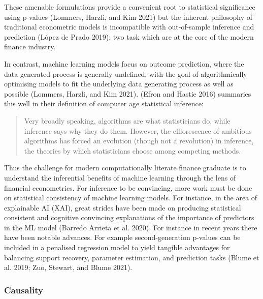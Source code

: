\documentclass{article}
\begin{document}
These amenable formulations provide a convenient root to statistical
significance using p-values (Lommers, Harzli, and Kim 2021) but the
inherent philosophy of traditional econometric models is incompatible
with out-of-sample inference and prediction (López de Prado 2019); two
task which are at the core of the modern finance industry.

In contrast, machine learning models focus on outcome prediction, where
the data generated process is generally undefined, with the goal of
algorithmically optimising models to fit the underlying data generating
process as well as possible (Lommers, Harzli, and Kim 2021). (Efron and
Hastie 2016) summaries this well in their definition of computer age
statistical inference:

\begin{quote}
Very broadly speaking, algorithms are what statisticians do, while
inference says why they do them. However, the efflorescence of ambitious
algorithms has forced an evolution (though not a revolution) in
inference, the theories by which statisticians choose among competing
methods.
\end{quote}

Thus the challenge for modern computationally literate finance graduate
is to understand the inferential benefits of machine learning through
the lens of financial econometrics. For inference to be convincing, more
work must be done on statistical consistency of machine learning models.
For instance, in the area of explainable AI (XAI), great strides have
been made on producing statistical consistent and cognitive convincing
explanations of the importance of predictors in the ML model (Barredo
Arrieta et al. 2020). For instance in recent years there have been
notable advances. For example second-generation p-values can be included
in a penalised regression model to yield tangible advantages for
balancing support recovery, parameter estimation, and prediction tasks
(Blume et al. 2019; Zuo, Stewart, and Blume 2021).

\hypertarget{causality}{%
\subsubsection{Causality}\label{causality}}
\end{document}
